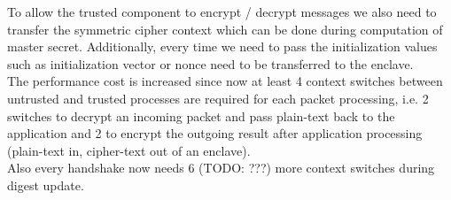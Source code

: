 \documentclass[../../main.tex]{subfiles}
\begin{document}
\noindent To allow the trusted component to encrypt / decrypt messages
we also need to transfer the symmetric cipher context which can be
done during computation of master secret. Additionally, every time we
need to pass the initialization values such as initialization vector
or nonce need to be transferred to the enclave.\\

\noindent The performance cost is increased since now at least 4
context switches between untrusted and trusted processes are required
for each packet processing, i.e. 2 switches to decrypt an incoming
packet and pass plain-text back to the application and 2 to encrypt
the outgoing result after application processing (plain-text in,
cipher-text out of an enclave).\\

\noindent Also every handshake now needs 6 (TODO: ???) more context
switches during digest update.
\end{document}
